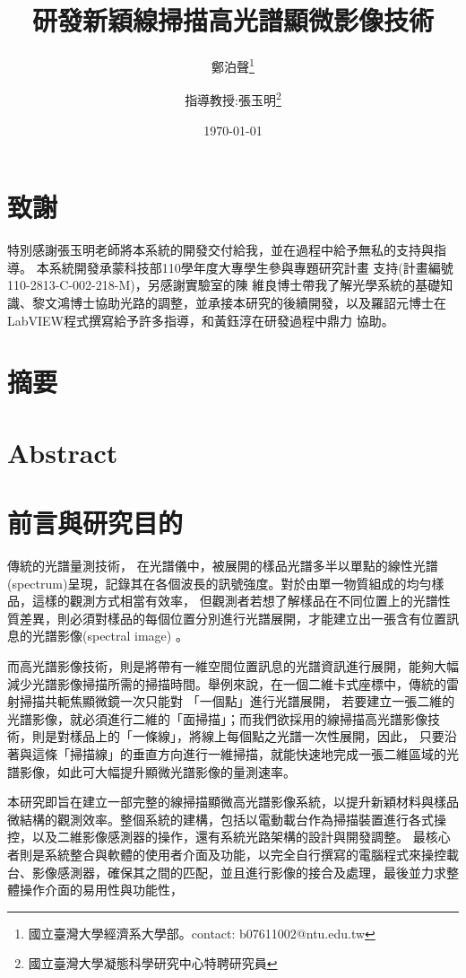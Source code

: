 \documentclass[12pt]{article}
\title{研發新穎線掃描高光譜顯微影像技術}
\author{鄭泊聲\thanks{國立臺灣大學經濟系大學部。contact: b07611002@ntu.edu.tw}
\and 指導教授:張玉明\thanks{國立臺灣大學凝態科學研究中心特聘研究員}}
\date{\today}
\begin{document}
\maketitle
{}
\section*{致謝}
特別感謝張玉明老師將本系統的開發交付給我，並在過程中給予無私的支持與指導。
本系統開發承蒙科技部110學年度大專學生參與專題研究計畫
支持(計畫編號110-2813-C-002-218-M)，另感謝實驗室的陳
維良博士帶我了解光學系統的基礎知識、黎文鴻博士協助光路的調整，並承接本研究的後續開發，以及羅詔元博士在LabVIEW程式撰寫給予許多指導，和黃鈺淳在研發過程中鼎力
協助。
\section*{摘要}
\section*{Abstract}
\tableofcontents
\listoffigures
\listoftables
{}
\section{前言與研究目的}
傳統的光譜量測技術，
在光譜儀中，被展開的樣品光譜多半以單點的線性光譜(spectrum)呈現，記錄其在各個波長的訊號強度。對於由單一物質組成的均勻樣品，這樣的觀測方式相當有效率，
但觀測者若想了解樣品在不同位置上的光譜性質差異，則必須對樣品的每個位置分別進行光譜展開，才能建立出一張含有位置訊息的光譜影像(spectral image)
。

而高光譜影像技術，則是將帶有一維空間位置訊息的光譜資訊進行展開，能夠大幅減少光譜影像掃描所需的掃描時間。舉例來說，在一個二維卡式座標中，傳統的雷射掃描共軛焦顯微鏡一次只能對
「一個點」進行光譜展開，
若要建立一張二維的光譜影像，就必須進行二維的「面掃描」；而我們欲採用的線掃描高光譜影像技術，則是對樣品上的「一條線」，將線上每個點之光譜一次性展開，因此，
只要沿著與這條「掃描線」的垂直方向進行一維掃描，就能快速地完成一張二維區域的光譜影像，如此可大幅提升顯微光譜影像的量測速率。

本研究即旨在建立一部完整的線掃描顯微高光譜影像系統，以提升新穎材料與樣品微結構的觀測效率。整個系統的建構，包括以電動載台作為掃描裝置進行各式操控，以及二維影像感測器的操作，還有系統光路架構的設計與開發調整。
最核心者則是系統整合與軟體的使用者介面及功能，以完全自行撰寫的電腦程式來操控載台、影像感測器，確保其之間的匹配，並且進行影像的接合及處理，最後並力求整體操作介面的易用性與功能性，
\end{document}
